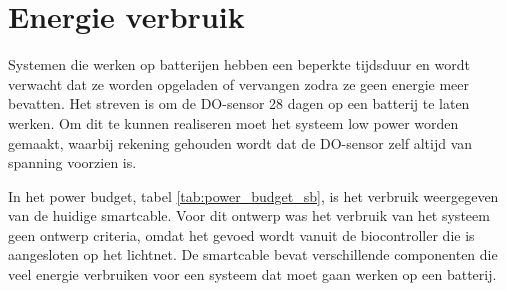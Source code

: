 \section{Energie verbruik}
Systemen die werken op batterijen hebben een beperkte tijdsduur en wordt verwacht dat ze worden opgeladen of vervangen zodra ze geen energie meer bevatten. Het streven is om de DO-sensor 28 dagen op een batterij te laten werken. Om dit te kunnen realiseren moet het systeem low power worden gemaakt, waarbij rekening gehouden wordt dat de DO-sensor zelf altijd van spanning voorzien is.


\begin{table}[H]
	\centering
	\caption{Power budget van de bioreactor module}
	\label{tab:power_budget_sb}
\end{table}

In het power budget, tabel \ref{tab:power_budget_sb}, is het verbruik weergegeven van de huidige smartcable. Voor dit ontwerp was het verbruik van het systeem geen ontwerp criteria, omdat het gevoed wordt vanuit de biocontroller die is aangesloten op het lichtnet. De smartcable bevat verschillende componenten die veel energie verbruiken voor een systeem dat moet gaan werken op een batterij. 


